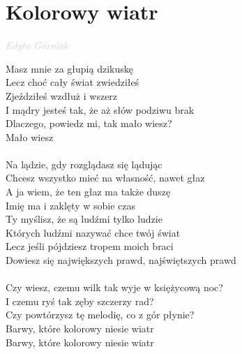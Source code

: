 \documentclass[a5paper, 10pt]{book}
\begin{document}
\newpage
\section{Kolorowy wiatr}\textcolor{lightgray}{\textit{Edyta Górniak}}\vspace*{1.5mm}\\
\begin{minipage}[t]{0.8\textwidth}
  \hspace*{3mm}Masz mnie za głupią dzikuskę\\
  \hspace*{3mm}Lecz choć cały świat zwiedziłeś\\
  \hspace*{3mm}Zjeździłeś wzdłuż i wszerz\\
  \hspace*{3mm}I mądry jesteś tak, że aż słów podziwu brak\\
  \hspace*{3mm}Dlaczego, powiedz mi, tak mało wiesz?\\
  \hspace*{3mm}Mało wiesz\\
  \\
  Na lądzie, gdy rozglądasz się lądując\\
  Chcesz wszystko mieć na własność, nawet głaz\\
  A ja wiem, że ten głaz ma także duszę\\
  Imię ma i zaklęty w sobie czas\vspace*{1.5mm}\\
  Ty myślisz, że są ludźmi tylko ludzie\\
  Których ludźmi nazywać chce twój świat\\
  Lecz jeśli pójdziesz tropem moich braci \\
  Dowiesz się największych prawd, najświętszych prawd \\
  \\
  \hspace*{5mm}Czy wiesz, czemu wilk tak wyje w księżycową noc?\\
  \hspace*{5mm}I czemu ryś tak zęby szczerzy rad?\\
  \hspace*{5mm}Czy powtórzysz tę melodię, co z gór płynie?\\
  \hspace*{5mm}Barwy, które kolorowy niesie wiatr\\
  \hspace*{5mm}Barwy, które kolorowy niesie wiatr\\

\end{minipage}
\end{document}
